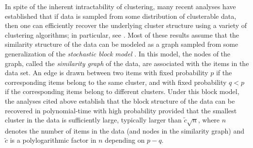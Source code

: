 \documentclass[twoside,11pt]{article}
\newcommand{\0}{\bs{0}}
\begin{document}
In spite of the inherent intractability of clustering, %
many recent analyses have established that if
data is sampled from some distribution of clusterable data, then one can efficiently recover the underlying
cluster structure using a variety of clustering algorithms;
in particular, see  \citet{ abbe2016exact,  ailon2013breaking, ames2014convex, ames2014guaranteed, amini2014semidefinite, cai2015robust, chen2014clustering, chen2014improved, chen2014statistical, guedon2015community, hajek2015achieving,
lei2015consistency,  mathieu2010correlation,nellore2013recovery, oymak2011finding,rohe2011spectral, qin2013regularized, vinayak2014sharp}.
Most of these results assume that the similarity structure of the data can be
modeled as a graph sampled from some
generalization of the
\emph{stochastic block model} \citep{holland1983stochastic}. In this model, the nodes of the graph, called the \emph{similarity graph} of the data, are associated with the items in the data set. An edge is drawn between two items with fixed probability $p$ if the corresponding items belong to the same cluster, and with fixed probability $q < p$ if the corresponding items belong to different clusters. %
Under this block model, the analyses cited above establish
 that the block structure of the data can be recovered in polynomial-time
 with high probability
provided that the smallest cluster in the data is sufficiently large, typically larger than \( \tilde c \sqrt{n} \), where \(n\)
denotes the number of items in the data (and nodes in the similarity graph) and \(\tilde c \) is a polylogarithmic factor in \(n\)
depending on \(p - q \).
\end{document}
